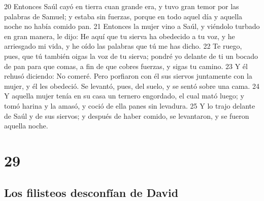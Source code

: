 20 Entonces Saúl cayó en tierra cuan grande era, y tuvo gran temor por las palabras de Samuel; y estaba sin fuerzas, porque en todo aquel día y aquella noche no había comido pan.
21 Entonces la mujer vino a Saúl, y viéndolo turbado en gran manera, le dijo: He aquí que tu sierva ha obedecido a tu voz, y he arriesgado mi vida, y he oído las palabras que tú me has dicho.
22 Te ruego, pues, que tú también oigas la voz de tu sierva; pondré yo delante de ti un bocado de pan para que comas, a fin de que cobres fuerzas, y sigas tu camino.
23 Y él rehusó diciendo: No comeré. Pero porfiaron con él sus siervos juntamente con la mujer, y él les obedeció. Se levantó, pues, del suelo, y se sentó sobre una cama.
24 Y aquella mujer tenía en su casa un ternero engordado, el cual mató luego; y tomó harina y la amasó, y coció de ella panes sin levadura. 
25 Y lo trajo delante de Saúl y de sus siervos; y después de haber comido, se levantaron, y se fueron aquella noche.

\chapter{29}

\section*{Los filisteos desconfían de David}


